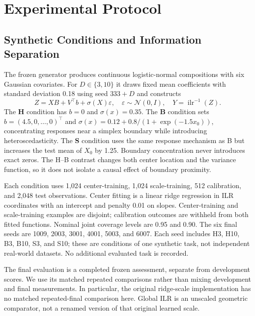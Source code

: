 \documentclass{article}
\newcommand{\ilr}{\operatorname{ilr}}
\begin{document}
\section{Experimental Protocol}
\subsection{Synthetic Conditions and Information Separation}
The frozen generator produces continuous logistic-normal compositions with six Gaussian covariates. For $D\in\{3,10\}$ it draws fixed mean coefficients with standard deviation 0.18 using seed $333+D$ and constructs
\begin{equation}
 Z=X B+V^\top b+\sigma(X)\varepsilon,\quad
 \varepsilon\sim\mathcal N(0,I),\quad Y=\ilr^{-1}(Z).
\end{equation}
The \textbf{H} condition has $b=0$ and $\sigma(x)=0.35$. The \textbf{B} condition sets $b=(4.5,0,\ldots,0)^\top$ and
$\sigma(x)=0.12+0.8/(1+\exp(-1.5x_0))$, concentrating responses near a simplex boundary while introducing heteroscedasticity. The \textbf{S} condition uses the same response mechanism as B but increases the test mean of $X_0$ by 1.25. Boundary concentration never introduces exact zeros. The H--B contrast changes both center location and the variance function, so it does not isolate a causal effect of boundary proximity.

Each condition uses 1,024 center-training, 1,024 scale-training, 512 calibration, and 2,048 test observations. Center fitting is a linear ridge regression in ILR coordinates with an intercept and penalty 0.01 on slopes. Center-training and scale-training examples are disjoint; calibration outcomes are withheld from both fitted functions. Nominal joint coverage levels are 0.95 and 0.90. The six final seeds are 1009, 2003, 3001, 4001, 5003, and 6007. Each seed includes H3, H10, B3, B10, S3, and S10; these are conditions of one synthetic task, not independent real-world datasets. No additional evaluated task is recorded.

The final evaluation is a completed frozen assessment, separate from development scores. We use its matched repeated comparisons rather than mixing development and final measurements. In particular, the original ridge-scale implementation has no matched repeated-final comparison here. Global ILR is an unscaled geometric comparator, not a renamed version of that original learned scale.
\end{document}
